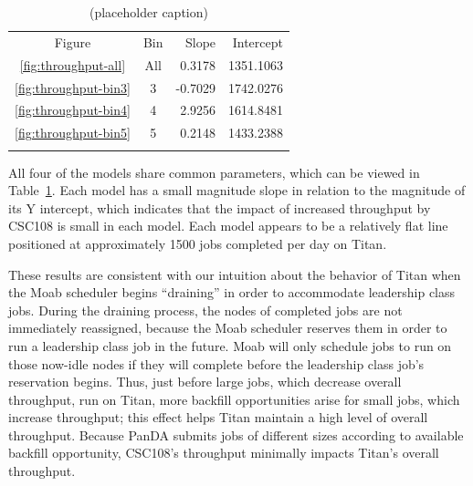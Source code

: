 \begin{table}
\caption{(placeholder caption)}
\label{tab:throughput-params}       %
\begin{tabular}{ccrr}
\hline\noalign{\smallskip}
Figure  &   Bin & Slope   & Intercept   \\
\noalign{\smallskip}\hline\noalign{\smallskip}
\ref{fig:throughput-all}    &   All &   0.3178  &   1351.1063   \\
\ref{fig:throughput-bin3}   &   3   &   -0.7029 &   1742.0276   \\
\ref{fig:throughput-bin4}   &   4   &   2.9256  &   1614.8481   \\
\ref{fig:throughput-bin5}   &   5   &   0.2148  &   1433.2388   \\
\noalign{\smallskip}\hline
\end{tabular}
\end{table}

All four of the models share common parameters, which can be viewed in
Table~\ref{tab:throughput-params}. Each model has a small magnitude slope in
relation to the magnitude of its Y intercept, which indicates that the impact
of increased throughput by CSC108 is small in each model. Each model appears to
be a relatively flat line positioned at approximately 1500 jobs completed per
day on Titan.

These results are consistent with our intuition about the behavior of Titan
when the Moab scheduler begins ``draining'' in order to accommodate leadership
class jobs. During the draining process, the nodes of completed jobs are not
immediately reassigned, because the Moab scheduler reserves them in order to
run a leadership class job in the future. Moab will only schedule jobs to run
on those now-idle nodes if they will complete before the leadership class job's
reservation begins. Thus, just before large jobs, which decrease overall
throughput, run on Titan, more backfill opportunities arise for small jobs,
which increase throughput; this effect helps Titan maintain a high level of
overall throughput. Because PanDA submits jobs of different sizes according to
available backfill opportunity, CSC108's throughput minimally impacts Titan's
overall throughput.

